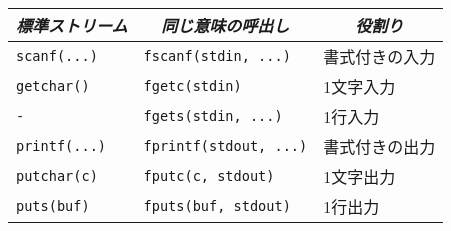 \documentclass{standalone}
\def\|{\verb|} %|
\begin{document}
\begin{tabular}{l|l|l}
\hline\hline
\multicolumn{1}{c}{\emph{標準ストリーム}} &
\multicolumn{1}{|c}{\emph{同じ意味の呼出し}} &
\multicolumn{1}{|c}{\emph{役割り}} \\
\hline
\|scanf(...)|   & \|fscanf(stdin, ...)|   & 書式付きの入力  \\
\|getchar()|    & \|fgetc(stdin)|         & 1文字入力       \\
\|-|            & \|fgets(stdin, ...)|    & 1行入力         \\
\|printf(...)|  & \|fprintf(stdout, ...)| & 書式付きの出力  \\
\|putchar(c)|   & \|fputc(c, stdout)|     & 1文字出力       \\
\|puts(buf)|    & \|fputs(buf, stdout)|   & 1行出力       \\
\end{tabular}
\end{document}
